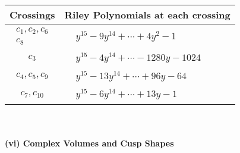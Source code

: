 \documentclass[1p]{elsarticle_modified}
\theoremstyle{definition}
\begin{document}
\begin{tabular}{m{50pt}|m{274pt}}
Crossings & \hspace{64pt}Riley Polynomials at each crossing \\
\hline $$\begin{aligned}c_{1},c_{2},c_{6}\\c_{8}\end{aligned}$$&$\begin{aligned}
&y^{15}-9 y^{14}+\cdots+4 y^2-1
\end{aligned}$\\
\hline $$\begin{aligned}c_{3}\end{aligned}$$&$\begin{aligned}
&y^{15}-4 y^{14}+\cdots-1280 y-1024
\end{aligned}$\\
\hline $$\begin{aligned}c_{4},c_{5},c_{9}\end{aligned}$$&$\begin{aligned}
&y^{15}-13 y^{14}+\cdots+96 y-64
\end{aligned}$\\
\hline $$\begin{aligned}c_{7},c_{10}\end{aligned}$$&$\begin{aligned}
&y^{15}-6 y^{14}+\cdots+13 y-1
\end{aligned}$\\
\hline
\end{tabular}\\~\\
\newpage\flushleft \textbf{(vi) Complex Volumes and Cusp Shapes}
\end{document}
